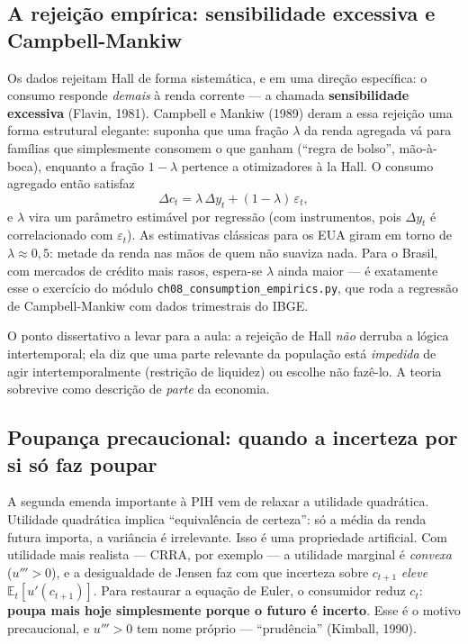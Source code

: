 \documentclass[11pt,a4paper]{article}
\newcommand{\E}{\mathbb{E}}
\newcommand{\ideia}[1]{\textcolor{destaque}{\textbf{#1}}}
\begin{document}
\subsection{A rejeição empírica: sensibilidade excessiva e Campbell-Mankiw}

Os dados rejeitam Hall de forma sistemática, e em uma direção específica:
o consumo responde \emph{demais} à renda corrente --- a chamada
\ideia{sensibilidade excessiva} (Flavin, 1981). Campbell e Mankiw (1989)
deram a essa rejeição uma forma estrutural elegante: suponha que uma
fração $\lambda$ da renda agregada vá para famílias que simplesmente
consomem o que ganham (``regra de bolso'', mão-à-boca), enquanto a
fração $1-\lambda$ pertence a otimizadores à la Hall. O consumo agregado
então satisfaz
\[
  \Delta c_t = \lambda\,\Delta y_t + (1-\lambda)\,\varepsilon_t,
\]
e $\lambda$ vira um parâmetro estimável por regressão (com instrumentos,
pois $\Delta y_t$ é correlacionado com $\varepsilon_t$). As estimativas
clássicas para os EUA giram em torno de $\lambda \approx 0{,}5$: metade
da renda nas mãos de quem não suaviza nada. Para o Brasil, com mercados
de crédito mais rasos, espera-se $\lambda$ ainda maior --- é exatamente
esse o exercício do módulo \texttt{ch08\_consumption\_empirics.py}, que
roda a regressão de Campbell-Mankiw com dados trimestrais do IBGE.

O ponto dissertativo a levar para a aula: a rejeição de Hall \emph{não}
derruba a lógica intertemporal; ela diz que uma parte relevante da
população está \emph{impedida} de agir intertemporalmente (restrição de
liquidez) ou escolhe não fazê-lo. A teoria sobrevive como descrição de
\emph{parte} da economia.

\subsection{Poupança precaucional: quando a incerteza por si só faz poupar}

A segunda emenda importante à PIH vem de relaxar a utilidade quadrática.
Utilidade quadrática implica ``equivalência de certeza'': só a média da
renda futura importa, a variância é irrelevante. Isso é uma propriedade
artificial. Com utilidade mais realista --- CRRA, por exemplo --- a
utilidade marginal é \emph{convexa} ($u''' > 0$), e a desigualdade de
Jensen faz com que incerteza sobre $c_{t+1}$ \emph{eleve}
$\E_t[u'(c_{t+1})]$. Para restaurar a equação de Euler, o consumidor
reduz $c_t$: \ideia{poupa mais hoje simplesmente porque o futuro é
incerto}. Esse é o motivo precaucional, e $u'''>0$ tem nome próprio ---
``prudência'' (Kimball, 1990).
\end{document}
